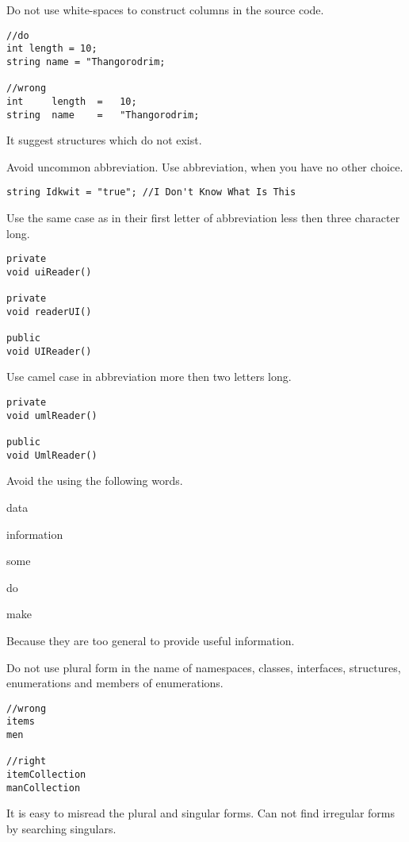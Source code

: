 \documentclass[11pt,a4paper]{book}
\begin{document}
\notmark Do not use white-spaces to construct columns in the source code. 
\begin{verbatim}
//do
int length = 10;
string name = "Thangorodrim;

//wrong
int     length  =   10;
string  name    =   "Thangorodrim;
\end{verbatim}

\whymark It suggest structures which do not exist.

\avoidmark Avoid uncommon abbreviation. Use abbreviation, when you have no other choice.
\begin{verbatim}
string Idkwit = "true"; //I Don't Know What Is This
\end{verbatim}

\domark Use the same case as in their first letter of abbreviation less then three character long.
\begin{verbatim}
private
void uiReader()

private
void readerUI()

public
void UIReader()
\end{verbatim}

\domark Use camel case in abbreviation more then two letters long.
\begin{verbatim}
private
void umlReader()

public
void UmlReader()
\end{verbatim}

\avoidmark Avoid the using the following words.
\begin{compactitem}
\item data
\item information
\item some
\item do
\item make
\end{compactitem}

\whymark Because they are too general to provide useful information.

\notmark Do not use plural form in the name of namespaces, classes, interfaces, structures, enumerations and members of enumerations.
\begin{verbatim}
//wrong
items
men

//right
itemCollection
manCollection
\end{verbatim}

\whymark It is easy to misread the plural and singular forms. Can not find irregular forms by searching singulars.
\end{document}
